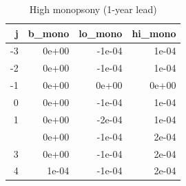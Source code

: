 \begin{table}

\caption{High monopsony (1-year lead)}
\centering
\begin{tabular}[t]{rrrr}
\toprule
j & b\_mono & lo\_mono & hi\_mono\\
\midrule
-3 & 0e+00 & -1e-04 & 1e-04\\
-2 & 0e+00 & -1e-04 & 1e-04\\
-1 & 0e+00 & 0e+00 & 0e+00\\
0 & 0e+00 & -1e-04 & 1e-04\\
1 & 0e+00 & -2e-04 & 1e-04\\
\addlinespace
2 & 0e+00 & -1e-04 & 2e-04\\
3 & 0e+00 & -1e-04 & 2e-04\\
4 & 1e-04 & -1e-04 & 2e-04\\
\bottomrule
\end{tabular}
\end{table}
